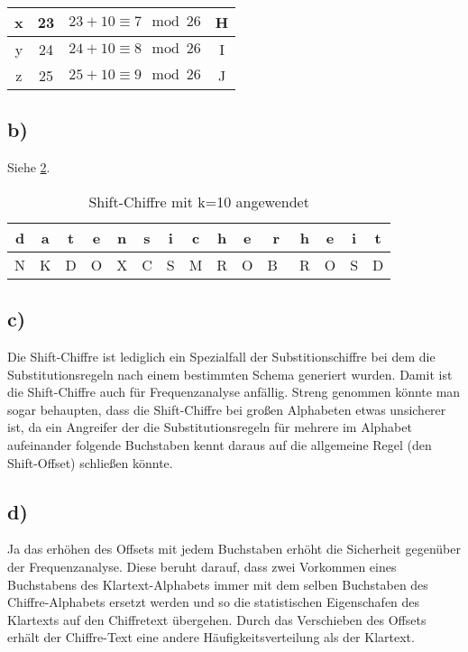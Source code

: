\documentclass[10pt,a4paper]{article}
\begin{document}
\begin{table}[htdp]
\begin{center}
\begin{tabular}{|c|c|c|c|}
	x & 23 & \begin{math} 23 + 10 \equiv 7 \mod 26 \end{math}  & H \\ \hline
	y & 24 & \begin{math} 24 + 10 \equiv 8 \mod 26 \end{math} & I \\ \hline
	z & 25 & \begin{math} 25 + 10 \equiv 9 \mod 26 \end{math} & J \\ \hline
\end{tabular}
\end{center}
\label{tbl:alphabet}
\end{table}%

\subsection*{b)}
Siehe \ref{tbl:encryption}. 
\begin{table}[htdp]
\caption{Shift-Chiffre mit k=10 angewendet}
\begin{center}
\begin{tabular}{|c|c|c|c|c|c|c|c|c|c|c|c|c|c|c|}
	d & a &  t & e & n & s & i & c & h & e & r & h & e  & i & t \\ \hline
	 N & K & D & O & X & C & S & M & R & O & B\ & R & O & S & D \\ \hline
\end{tabular}
\end{center}
\label{tbl:encryption}
\end{table}%
\subsection*{c)}
Die Shift-Chiffre ist lediglich ein Spezialfall der Substitionschiffre bei dem die Substitutionsregeln nach einem bestimmten Schema generiert wurden. Damit ist die Shift-Chiffre auch für Frequenzanalyse anfällig. Streng genommen könnte man sogar behaupten, dass die Shift-Chiffre bei großen Alphabeten etwas unsicherer ist, da ein Angreifer der die Substitutionsregeln für mehrere im Alphabet aufeinander folgende Buchstaben kennt daraus auf die allgemeine Regel (den Shift-Offset) schließen könnte.
\subsection*{d)}
Ja das erhöhen des Offsets mit jedem Buchstaben erhöht die Sicherheit gegenüber der Frequenzanalyse. Diese beruht darauf, dass zwei Vorkommen eines Buchstabens des Klartext-Alphabets immer mit dem selben Buchstaben des Chiffre-Alphabets ersetzt werden und so die statistischen Eigenschafen des Klartexts auf den Chiffretext übergehen. Durch das Verschieben des Offsets erhält der Chiffre-Text eine andere Häufigkeitsverteilung als der Klartext.
\end{document}
